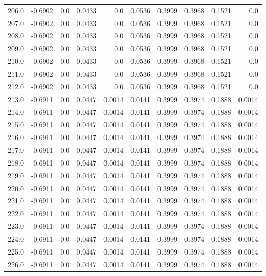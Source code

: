 \begin{longtable}{lrrrrrrrrr}
206.0 & -0.6902 & 0.0 & 0.0433 & 0.0 & 0.0536 & 0.3999 & 0.3968 & 0.1521 & 0.0 \\
207.0 & -0.6902 & 0.0 & 0.0433 & 0.0 & 0.0536 & 0.3999 & 0.3968 & 0.1521 & 0.0 \\
208.0 & -0.6902 & 0.0 & 0.0433 & 0.0 & 0.0536 & 0.3999 & 0.3968 & 0.1521 & 0.0 \\
209.0 & -0.6902 & 0.0 & 0.0433 & 0.0 & 0.0536 & 0.3999 & 0.3968 & 0.1521 & 0.0 \\
210.0 & -0.6902 & 0.0 & 0.0433 & 0.0 & 0.0536 & 0.3999 & 0.3968 & 0.1521 & 0.0 \\
211.0 & -0.6902 & 0.0 & 0.0433 & 0.0 & 0.0536 & 0.3999 & 0.3968 & 0.1521 & 0.0 \\
212.0 & -0.6902 & 0.0 & 0.0433 & 0.0 & 0.0536 & 0.3999 & 0.3968 & 0.1521 & 0.0 \\
213.0 & -0.6911 & 0.0 & 0.0447 & 0.0014 & 0.0141 & 0.3999 & 0.3974 & 0.1888 & 0.0014 \\
214.0 & -0.6911 & 0.0 & 0.0447 & 0.0014 & 0.0141 & 0.3999 & 0.3974 & 0.1888 & 0.0014 \\
215.0 & -0.6911 & 0.0 & 0.0447 & 0.0014 & 0.0141 & 0.3999 & 0.3974 & 0.1888 & 0.0014 \\
216.0 & -0.6911 & 0.0 & 0.0447 & 0.0014 & 0.0141 & 0.3999 & 0.3974 & 0.1888 & 0.0014 \\
217.0 & -0.6911 & 0.0 & 0.0447 & 0.0014 & 0.0141 & 0.3999 & 0.3974 & 0.1888 & 0.0014 \\
218.0 & -0.6911 & 0.0 & 0.0447 & 0.0014 & 0.0141 & 0.3999 & 0.3974 & 0.1888 & 0.0014 \\
219.0 & -0.6911 & 0.0 & 0.0447 & 0.0014 & 0.0141 & 0.3999 & 0.3974 & 0.1888 & 0.0014 \\
220.0 & -0.6911 & 0.0 & 0.0447 & 0.0014 & 0.0141 & 0.3999 & 0.3974 & 0.1888 & 0.0014 \\
221.0 & -0.6911 & 0.0 & 0.0447 & 0.0014 & 0.0141 & 0.3999 & 0.3974 & 0.1888 & 0.0014 \\
222.0 & -0.6911 & 0.0 & 0.0447 & 0.0014 & 0.0141 & 0.3999 & 0.3974 & 0.1888 & 0.0014 \\
223.0 & -0.6911 & 0.0 & 0.0447 & 0.0014 & 0.0141 & 0.3999 & 0.3974 & 0.1888 & 0.0014 \\
224.0 & -0.6911 & 0.0 & 0.0447 & 0.0014 & 0.0141 & 0.3999 & 0.3974 & 0.1888 & 0.0014 \\
225.0 & -0.6911 & 0.0 & 0.0447 & 0.0014 & 0.0141 & 0.3999 & 0.3974 & 0.1888 & 0.0014 \\
226.0 & -0.6911 & 0.0 & 0.0447 & 0.0014 & 0.0141 & 0.3999 & 0.3974 & 0.1888 & 0.0014 \\

\end{longtable}

